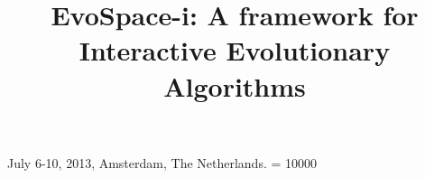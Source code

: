 \documentclass{sig-alternate}
\begin{document}
 {July 6-10, 2013, Amsterdam, The Netherlands.}
\widowpenalty = 10000


%

\title{EvoSpace-i: A framework for Interactive Evolutionary Algorithms}
%
%
%
%
%
\end{document}
